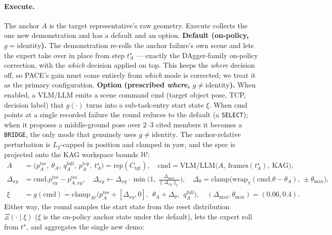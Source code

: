 \documentclass[letterpaper]{article} %
\begin{document}
\paragraph{Execute.}
The anchor $A$ is the target representative's raw geometry. Execute collects the one
new demonstration and has a default and an option. \textbf{Default (on-policy,
$g=\mathrm{identity}$).} The demonstration re-rolls the anchor failure's own scene
and lets the expert take over in place from step $t^\star_A$ --- exactly the
DAgger-family on-policy correction, with the \emph{which} decision applied on top.
This keeps the \emph{where} decision off, so PACE's gain must come entirely from
\emph{which} mode is corrected; we treat it as the primary configuration.
\textbf{Option (prescribed \emph{where}, $g\neq\mathrm{identity}$).} When enabled, a
VLM/LLM
\cite{yang2025qwen3,ma2024eureka,yu2023language2rewards,liang2023codeaspolicies}
emits a scene command $\mathrm{cmd}$ (target object pose, TCP, decision label) that
$g(\cdot)$ turns into a sub-task-entry start state $\xi$. When $\mathrm{cmd}$ points
at a single recorded failure the round reduces to the default (a \texttt{SELECT});
when it proposes a middle-ground pose over $2$--$3$ cited members it becomes a
\texttt{BRIDGE}, the only mode that genuinely uses $g\neq\mathrm{identity}$. The
anchor-relative perturbation is $L_2$-capped in position and clamped in yaw, and the
spec is projected onto the KAG workspace bounds $\mathcal{W}$:
\begin{align}
A&=\big(p^{\mathrm{tee}}_A,\ \theta_A,\ q^{\mathrm{full}}_A,\ p^{\mathrm{tcp}}_A,\ t^\star_A\big)=\mathrm{rep}(C_{\mathrm{tgt}}),
\quad
\mathrm{cmd}=\mathrm{VLM/LLM}\big(A,\ \text{frames}(t^\star_A),\ \mathrm{KAG}\big),\nonumber\\
\Delta_{xy}&=\mathrm{cmd}.p^{\mathrm{tee}}_{xy}-p^{\mathrm{tee}}_{A,xy},\quad
\Delta_{xy}\leftarrow\Delta_{xy}\cdot\min\!\Big(1,\ \tfrac{\Delta_{\max}}{\|\Delta_{xy}\|_2}\Big),\quad
\Delta_\theta=\mathrm{clamp}\big(\mathrm{wrap}_\pi(\mathrm{cmd}.\theta-\theta_A),\,\pm\theta_{\max}\big),\nonumber\\
\xi&=g(\mathrm{cmd})=\mathrm{clamp}_{\,\mathcal{W}}\Big(p^{\mathrm{tee}}_A+[\Delta_{xy},0],\ \ \theta_A+\Delta_\theta,\ \ q^{\mathrm{full}}_A\Big),
\quad
(\Delta_{\max},\theta_{\max})=(0.06,0.4).
\label{eq:prescribe}
\end{align}
Either way, the round samples the start state from the reset distribution
$\Xi(\cdot\mid\xi)$ ($\xi$ is the on-policy anchor state under the default), lets
the expert roll from $t^\star$, and aggregates the single new demo:
\end{document}
